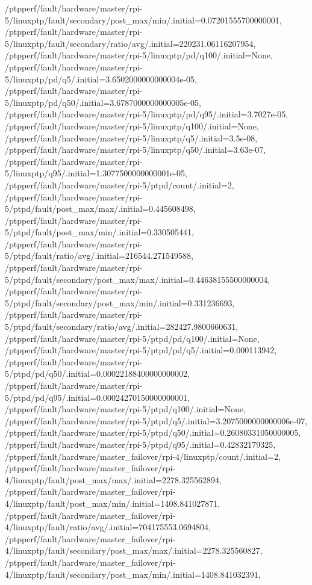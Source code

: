 {    /ptpperf/fault/hardware/master/rpi-5/linuxptp/fault/secondary/post_max/min/.initial=0.07201555700000001,
    /ptpperf/fault/hardware/master/rpi-5/linuxptp/fault/secondary/ratio/avg/.initial=220231.06116207954,
    /ptpperf/fault/hardware/master/rpi-5/linuxptp/pd/q100/.initial=None,
    /ptpperf/fault/hardware/master/rpi-5/linuxptp/pd/q5/.initial=3.6502000000000004e-05,
    /ptpperf/fault/hardware/master/rpi-5/linuxptp/pd/q50/.initial=3.6787000000000005e-05,
    /ptpperf/fault/hardware/master/rpi-5/linuxptp/pd/q95/.initial=3.7027e-05,
    /ptpperf/fault/hardware/master/rpi-5/linuxptp/q100/.initial=None,
    /ptpperf/fault/hardware/master/rpi-5/linuxptp/q5/.initial=3.5e-08,
    /ptpperf/fault/hardware/master/rpi-5/linuxptp/q50/.initial=3.63e-07,
    /ptpperf/fault/hardware/master/rpi-5/linuxptp/q95/.initial=1.3077500000000001e-05,
    /ptpperf/fault/hardware/master/rpi-5/ptpd/count/.initial=2,
    /ptpperf/fault/hardware/master/rpi-5/ptpd/fault/post_max/max/.initial=0.445608498,
    /ptpperf/fault/hardware/master/rpi-5/ptpd/fault/post_max/min/.initial=0.330505441,
    /ptpperf/fault/hardware/master/rpi-5/ptpd/fault/ratio/avg/.initial=216544.271549588,
    /ptpperf/fault/hardware/master/rpi-5/ptpd/fault/secondary/post_max/max/.initial=0.44638155500000004,
    /ptpperf/fault/hardware/master/rpi-5/ptpd/fault/secondary/post_max/min/.initial=0.331236693,
    /ptpperf/fault/hardware/master/rpi-5/ptpd/fault/secondary/ratio/avg/.initial=282427.9800660631,
    /ptpperf/fault/hardware/master/rpi-5/ptpd/pd/q100/.initial=None,
    /ptpperf/fault/hardware/master/rpi-5/ptpd/pd/q5/.initial=0.000113942,
    /ptpperf/fault/hardware/master/rpi-5/ptpd/pd/q50/.initial=0.00022188400000000002,
    /ptpperf/fault/hardware/master/rpi-5/ptpd/pd/q95/.initial=0.00024270150000000001,
    /ptpperf/fault/hardware/master/rpi-5/ptpd/q100/.initial=None,
    /ptpperf/fault/hardware/master/rpi-5/ptpd/q5/.initial=3.2075000000000006e-07,
    /ptpperf/fault/hardware/master/rpi-5/ptpd/q50/.initial=0.26080331050000005,
    /ptpperf/fault/hardware/master/rpi-5/ptpd/q95/.initial=0.42832179325,
    /ptpperf/fault/hardware/master_failover/rpi-4/linuxptp/count/.initial=2,
    /ptpperf/fault/hardware/master_failover/rpi-4/linuxptp/fault/post_max/max/.initial=2278.325562894,
    /ptpperf/fault/hardware/master_failover/rpi-4/linuxptp/fault/post_max/min/.initial=1408.841027871,
    /ptpperf/fault/hardware/master_failover/rpi-4/linuxptp/fault/ratio/avg/.initial=704175553.0694804,
    /ptpperf/fault/hardware/master_failover/rpi-4/linuxptp/fault/secondary/post_max/max/.initial=2278.325560827,
    /ptpperf/fault/hardware/master_failover/rpi-4/linuxptp/fault/secondary/post_max/min/.initial=1408.841032391,
}
